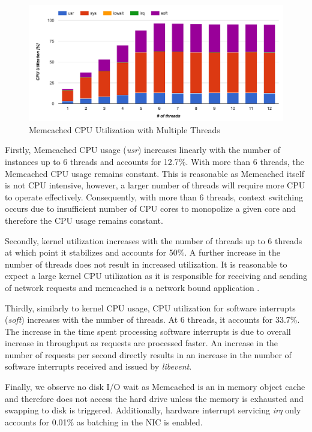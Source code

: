 \begin{figure}[h]
    \includegraphics[width=\textwidth]{./res2/m_threads_cpu.png}
    \caption{Memcached CPU Utilization with Multiple Threads}
    \label{fig:m_threads_cpu}
\end{figure}

Firstly, Memcached CPU usage (\textit{usr}) increases linearly with the number of instances up to 6 threads and accounts for 12.7\%. With more than 6 threads, the Memcached CPU usage remains constant. This is reasonable as Memcached itself is not CPU intensive, however, a larger number of threads will require more CPU to operate effectively. Consequently, with more than 6 threads, context switching occurs due to insufficient number of CPU cores to monopolize a given core and therefore the CPU usage remains constant.

Secondly, kernel utilization increases with the number of threads up to 6 threads at which point it stabilizes and accounts for 50\%. A further increase in the number of threads does not result in increased utilization. It is reasonable to expect a large kernel CPU utilization as it is responsible for receiving and sending of network requests and memcached is a network bound application \cite{belay2014ix}.

Thirdly, similarly to kernel CPU usage, CPU utilization for software interrupts (\textit{soft}) increases with the number of threads. At 6 threads, it accounts for 33.7\%. The increase in the time spent processing software interrupts is due to overall increase in throughput as requests are processed faster. An increase in the number of requests per second directly results in an increase in the number of software interrupts received and issued by \textit{libevent}.

Finally, we observe no disk I/O wait as Memcached is an in memory object cache and therefore does not access the hard drive unless the memory is exhausted and swapping to disk is triggered. Additionally, hardware interrupt servicing \textit{irq} only accounts for 0.01\% as batching in the NIC is enabled.


